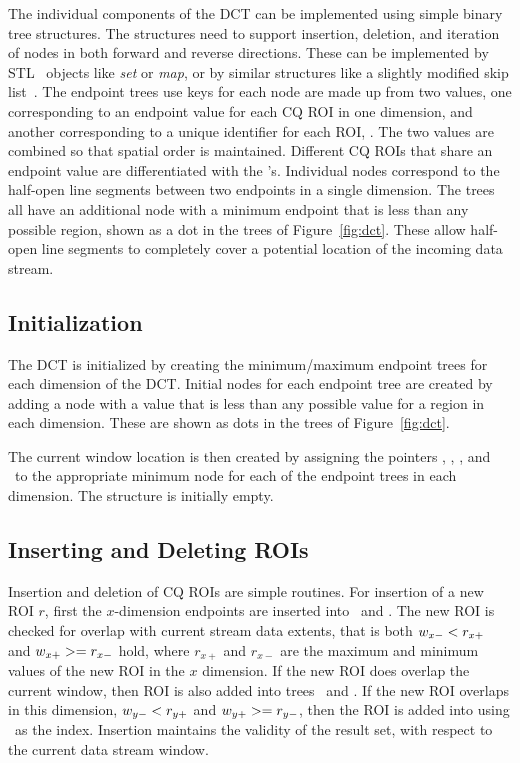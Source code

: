 \documentclass{ucdthesis}       %
\begin{document}
The individual components of the \ac{DCT} can be implemented using simple
binary tree structures.  The structures need to support insertion,
deletion, and iteration of nodes in both forward and reverse
directions.  These can be implemented by \ac{STL}~\cite{99stand-templ}
objects like \emph{set} or \emph{map}, or by similar structures like a
slightly modified skip list~\cite{pugh90skip}.  The endpoint trees use
keys for each node are made up from two values, one corresponding to
an endpoint value for each \ac{CQ} \ac{ROI} in one dimension, and
another corresponding to a unique identifier for each \ac{ROI},
\rid.  The two values are combined so that spatial order is
maintained.  Different \ac{CQ} \acp{ROI} that share an endpoint value
are differentiated with the \rid's.  Individual nodes correspond to
the half-open line segments between two endpoints in a single
dimension.  The trees all have an additional node with a minimum
endpoint that is less than any possible region, shown as a dot in the
trees of Figure~\ref{fig:dct}.  These allow half-open line segments to
completely cover a potential location of the incoming data stream.

\subsection{Initialization}

The \ac{DCT} is initialized by creating the minimum/maximum endpoint
trees for each dimension of the \ac{DCT}.  Initial nodes for each endpoint
tree are created by adding a node with a value that is less than any
possible value for a region in each dimension.  These are
shown as dots in the trees of Figure~\ref{fig:dct}.

The current window location is then created by assigning the pointers
\wxn, \wxx, \wyn, and \wyx\ to the appropriate minimum node for each of
the endpoint trees in each dimension.  The  structure is initially
empty.

\subsection{Inserting and Deleting \acp{ROI}}

Insertion and deletion of \ac{CQ} \acp{ROI} are simple routines. For
insertion of a new \ac{ROI} $r$, first the $x$-dimension endpoints are
inserted into \Xn\ and \Xx.  The new \ac{ROI} is checked for overlap
with current stream data extents, that is both $w_{x-} < r_{x+}$ and
$w_{x+} >= r_{x-}$ hold, where $r_{x+}$ and $r_{x-}$ are the maximum and
minimum values of the new \ac{ROI} in the $x$ dimension.  If the new
\ac{ROI} does overlap the current window, then \ac{ROI} is also added into
trees \Yn\ and \Yx.  If the new \ac{ROI} overlaps in this dimension,
$w_{y-} < r_{y+}$ and $w_{y+} >= r_{y-}$, then the \ac{ROI} is added into
 using \rid\ as the index.  Insertion maintains the validity of the
result set,  with respect to the current data stream window.
\end{document}
